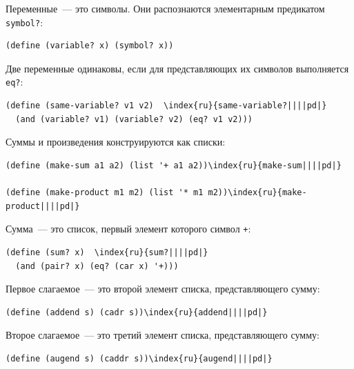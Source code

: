 \begin{plainlist}


\item
Переменные~--- это символы.  Они распознаются
элементарным предикатом {\tt symbol?}:   

\begin{Verbatim}[fontsize=\small]
(define (variable? x) (symbol? x))
\end{Verbatim}

\item
Две переменные одинаковы, если для представляющих
их символов выполняется {\tt eq?}:

\begin{Verbatim}[fontsize=\small]
(define (same-variable? v1 v2)  \index{ru}{same-variable?||||pd|}
  (and (variable? v1) (variable? v2) (eq? v1 v2)))
\end{Verbatim}

\item
Суммы и произведения конструируются как списки:

\begin{Verbatim}[fontsize=\small]
(define (make-sum a1 a2) (list '+ a1 a2))\index{ru}{make-sum||||pd|}

(define (make-product m1 m2) (list '* m1 m2))\index{ru}{make-product||||pd|}
\end{Verbatim}

\item
Сумма~--- это список, первый элемент которого
символ {\tt +}:

\begin{Verbatim}[fontsize=\small]
(define (sum? x)  \index{ru}{sum?||||pd|}
  (and (pair? x) (eq? (car x) '+)))
\end{Verbatim}

\item
Первое слагаемое~--- это второй элемент списка,
представляющего сумму:

\begin{Verbatim}[fontsize=\small]
(define (addend s) (cadr s))\index{ru}{addend||||pd|}
\end{Verbatim}

\item
Второе слагаемое~--- это третий элемент списка,
представляющего сумму:

\begin{Verbatim}[fontsize=\small]
(define (augend s) (caddr s))\index{ru}{augend||||pd|}
\end{Verbatim}


\end{plainlist}
